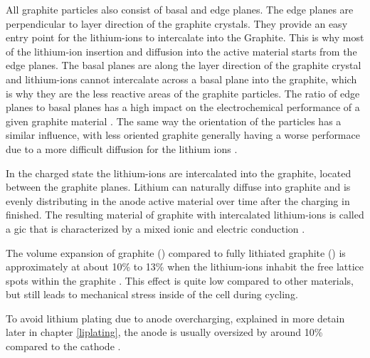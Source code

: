 All graphite particles also consist of basal and edge planes. The edge planes are perpendicular to layer direction of the graphite crystals. They provide an easy entry point for the lithium-ions to intercalate into the Graphite. This is why most of the lithium-ion insertion and diffusion into the active material starts from the edge planes. The basal planes are along the layer direction of the graphite crystal and lithium-ions cannot intercalate across a basal plane into the graphite, which is why they are the less reactive areas of the graphite particles. The ratio of edge planes to basal planes has a high impact on the electrochemical performance of a given graphite material \cite{An.2016}. The same way the orientation of the particles has a similar influence, with less oriented graphite generally having a worse performace due to a more difficult diffusion for the lithium ions \cite{Agubra.2013}.  \par
In the charged state the lithium-ions are intercalated into the graphite, located between the graphite planes. Lithium can naturally diffuse into graphite and is evenly distributing in the anode active material over time after the charging in finished. The resulting material of graphite with intercalated lithium-ions is called a \gls{gic} that is characterized by a mixed ionic and electric conduction \cite{Li.2019}. \par
The volume expansion of graphite () compared to fully lithiated graphite () is approximately at about 10\% to 13\% when the lithium-ions inhabit the free lattice spots within the graphite \cite{Lin.2016,Li.2019}. This effect is quite low compared to other materials, but still leads to mechanical stress inside of the cell during cycling. \par
To avoid lithium plating due to anode overcharging, explained in more detain later in chapter \ref{liplating}, the anode is usually oversized by around 10\% compared to the cathode \cite{Gallego.2014}.

